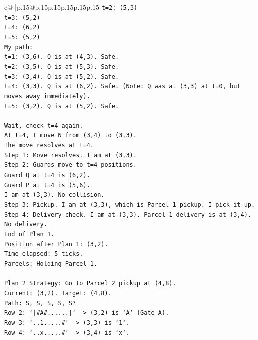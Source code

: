 \documentclass{article}
\begin{document}
{\begin{supertabular}{c@{$\;$}|p{.15\linewidth}@{}p{.15\linewidth}p{.15\linewidth}p{.15\linewidth}p{.15\linewidth}p{.15\linewidth}}
{{{\texttt{t=2: (5,3)} \\
\texttt{t=3: (5,2)} \\
\texttt{t=4: (6,2)} \\
\texttt{t=5: (5,2)} \\
\texttt{My path:} \\
\texttt{t=1: (3,6). Q is at (4,3). Safe.} \\
\texttt{t=2: (3,5). Q is at (5,3). Safe.} \\
\texttt{t=3: (3,4). Q is at (5,2). Safe.} \\
\texttt{t=4: (3,3). Q is at (6,2). Safe. (Note: Q was at (3,3) at t=0, but moves away immediately).} \\
\texttt{t=5: (3,2). Q is at (5,2). Safe.} \\
\\ 
\texttt{Wait, check t=4 again.} \\
\texttt{At t=4, I move N from (3,4) to (3,3).} \\
\texttt{The move resolves at t=4.} \\
\texttt{Step 1: Move resolves. I am at (3,3).} \\
\texttt{Step 2: Guards move to t=4 positions.} \\
\texttt{Guard Q at t=4 is (6,2).} \\
\texttt{Guard P at t=4 is (5,6).} \\
\texttt{I am at (3,3). No collision.} \\
\texttt{Step 3: Pickup. I am at (3,3), which is Parcel 1 pickup. I pick it up.} \\
\texttt{Step 4: Delivery check. I am at (3,3). Parcel 1 delivery is at (3,4). No delivery.} \\
\texttt{End of Plan 1.} \\
\texttt{Position after Plan 1: (3,2).} \\
\texttt{Time elapsed: 5 ticks.} \\
\texttt{Parcels: Holding Parcel 1.} \\
\\ 
\texttt{Plan 2 Strategy: Go to Parcel 2 pickup at (4,8).} \\
\texttt{Current: (3,2). Target: (4,8).} \\
\texttt{Path: S, S, S, S, S?} \\
\texttt{Row 2: `|\#A\#......|` {-}> (3,2) is `A` (Gate A).} \\
\texttt{Row 3: `..1.....\#` {-}> (3,3) is `1`.} \\
\texttt{Row 4: `..x.....\#` {-}> (3,4) is `x`.} \\
}}}
\end{supertabular}}
\end{document}

